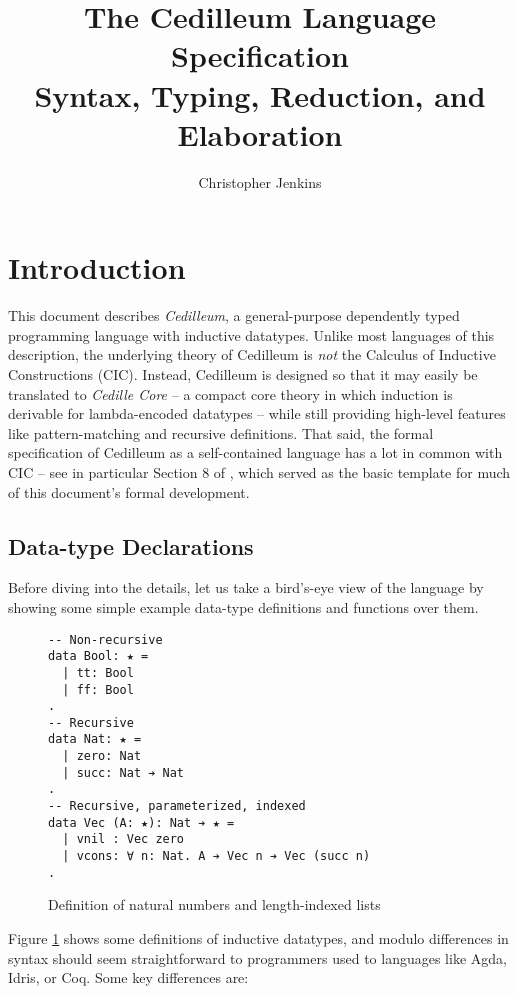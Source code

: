 \documentclass{article}
\begin{document}
\title{The Cedilleum Language Specification \\ \large Syntax, Typing, Reduction,
  and Elaboration }

\author{Christopher Jenkins}

\maketitle

\section{Introduction}
\label{sec:intro}
This document describes \textit{Cedilleum}, a general-purpose dependently typed
programming language with inductive datatypes. Unlike most languages of this
description, the underlying theory of Cedilleum is \textit{not} the Calculus of
Inductive Constructions (CIC)\cite{Pa15_Intro-CIC}. Instead, Cedilleum is
designed so that it may easily be translated to \textit{Cedille Core} -- a
compact core theory in which induction is derivable for lambda-encoded datatypes
-- while still providing high-level features like pattern-matching and recursive
definitions. That said, the formal specification of Cedilleum as a
self-contained language has a lot in common with CIC -- see in particular
Section 8 of \cite{In18_Coq-Docs}, which served as the basic template for much
of this document's formal development.

\subsection{Data-type Declarations}
Before diving into the details, let us take a bird's-eye view of the language
by showing some simple example data-type definitions and functions over them.

\begin{figure}[h]
\begin{verbatim}
-- Non-recursive
data Bool: ★ =
  | tt: Bool
  | ff: Bool
.
-- Recursive
data Nat: ★ = 
  | zero: Nat
  | succ: Nat ➔ Nat
.
-- Recursive, parameterized, indexed
data Vec (A: ★): Nat ➔ ★ =
  | vnil : Vec zero
  | vcons: ∀ n: Nat. A ➔ Vec n ➔ Vec (succ n)
.
\end{verbatim}
  \caption{Definition of natural numbers and length-indexed lists}
  \label{fig:ex-data-decl}
\end{figure}
Figure \ref{fig:ex-data-decl} shows some definitions of inductive datatypes, and
modulo differences in syntax should seem straightforward to programmers used
to languages like Agda, Idris, or Coq. Some key differences are:
\end{document}
